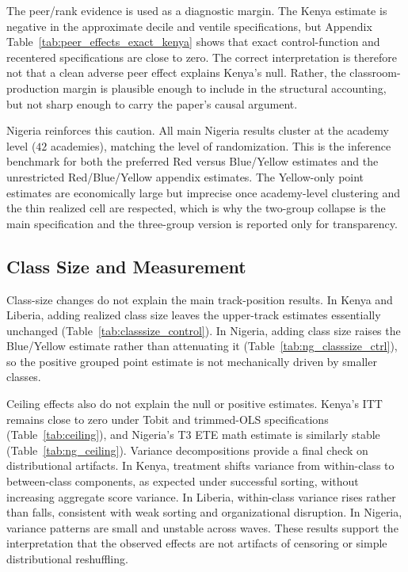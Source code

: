 \documentclass[11pt]{article}
\begin{document}
The peer/rank evidence is used as a diagnostic margin. The Kenya estimate is negative in the approximate decile and ventile specifications, but Appendix Table~\ref{tab:peer_effects_exact_kenya} shows that exact control-function and recentered specifications are close to zero. The correct interpretation is therefore not that a clean adverse peer effect explains Kenya's null. Rather, the classroom-production margin is plausible enough to include in the structural accounting, but not sharp enough to carry the paper's causal argument.

Nigeria reinforces this caution. All main Nigeria results cluster at the academy level ($42$ academies), matching the level of randomization. This is the inference benchmark for both the preferred Red versus Blue/Yellow estimates and the unrestricted Red/Blue/Yellow appendix estimates. The Yellow-only point estimates are economically large but imprecise once academy-level clustering and the thin realized cell are respected, which is why the two-group collapse is the main specification and the three-group version is reported only for transparency.

\subsection{Class Size and Measurement}

Class-size changes do not explain the main track-position results. In Kenya and Liberia, adding realized class size leaves the upper-track estimates essentially unchanged (Table~\ref{tab:classsize_control}). In Nigeria, adding class size raises the Blue/Yellow estimate rather than attenuating it (Table~\ref{tab:ng_classsize_ctrl}), so the positive grouped point estimate is not mechanically driven by smaller classes.

Ceiling effects also do not explain the null or positive estimates. Kenya's ITT remains close to zero under Tobit and trimmed-OLS specifications (Table~\ref{tab:ceiling}), and Nigeria's T3 ETE math estimate is similarly stable (Table~\ref{tab:ng_ceiling}). Variance decompositions provide a final check on distributional artifacts. In Kenya, treatment shifts variance from within-class to between-class components, as expected under successful sorting, without increasing aggregate score variance. In Liberia, within-class variance rises rather than falls, consistent with weak sorting and organizational disruption. In Nigeria, variance patterns are small and unstable across waves. These results support the interpretation that the observed effects are not artifacts of censoring or simple distributional reshuffling.
\end{document}
